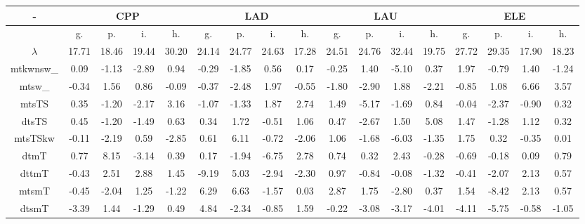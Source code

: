 \documentclass[%
 aip,
 jmp,%
 amsmath,amssymb,
 reprint,%
 floatfix,
]{revtex4-1}
\begin{document}
\begin{table}
  \centering
    \footnotesize
\setlength{\tabcolsep}{.26667em}
\begin{tabular}{|c|| c|c|c|c|| c|c|c|c|| c|c|c|c|| c|c|c|c|}\hline
-\-  & \multicolumn{4}{c|}{CPP} & \multicolumn{4}{c|}{LAD} & \multicolumn{4}{c|}{LAU} & \multicolumn{4}{c|}{ELE} \\ \hline\hline
 & g. & p. & i. & h. &     g. & p. & i. & h. &    g. & p. & i. & h. &    g. & p. & i. & h. \\\hline
$\lambda$ & 17.71 & 18.46 & 19.44 & 30.20 & 24.14 & 24.77 & 24.63 & 17.28 & 24.51 & 24.76 & 32.44 & 19.75 & 27.72 & 29.35 & 17.90 & 18.23 \\\hline
mtkwnsw\_ & 0.09 & -1.13 & -2.89 & 0.94 & -0.29 & -1.85 & 0.56 & 0.17 & -0.25 & 1.40 & -5.10 & 0.37 & 1.97 & -0.79 & 1.40 & -1.24 \\\hline
mtsw\_ & -0.34 & 1.56 & 0.86 & -0.09 & -0.37 & -2.48 & 1.97 & -0.55 & -1.80 & -2.90 & 1.88 & -2.21 & -0.85 & 1.08 & 6.66 & 3.57 \\\hline
mtsTS & 0.35 & -1.20 & -2.17 & 3.16 & -1.07 & -1.33 & 1.87 & 2.74 & 1.49 & -5.17 & -1.69 & 0.84 & -0.04 & -2.37 & -0.90 & 0.32 \\\hline
dtsTS & 0.45 & -1.20 & -1.49 & 0.63 & 0.34 & 1.72 & -0.51 & 1.06 & 0.47 & -2.67 & 1.50 & 5.08 & 1.47 & -1.28 & 1.12 & 0.32 \\\hline
mtsTSkw & -0.11 & -2.19 & 0.59 & -2.85 & 0.61 & 6.11 & -0.72 & -2.06 & 1.06 & -1.68 & -6.03 & -1.35 & 1.75 & 0.32 & -0.35 & 0.01 \\\hline
dtmT & 0.77 & 8.15 & -3.14 & 0.39 & 0.17 & -1.94 & -6.75 & 2.78 & 0.74 & 0.32 & 2.43 & -0.28 & -0.69 & -0.18 & 0.09 & 0.79 \\\hline
dttmT & -0.43 & 2.51 & 2.88 & 1.45 & -9.19 & 5.03 & -2.94 & -2.30 & 0.97 & -0.84 & -0.08 & -1.32 & -0.41 & -2.07 & 2.13 & 0.57 \\\hline
mtsmT & -0.45 & -2.04 & 1.25 & -1.22 & 6.29 & 6.63 & -1.57 & 0.03 & 2.87 & 1.75 & -2.80 & 0.37 & 1.54 & -8.42 & 2.13 & 0.57 \\\hline
dtsmT & -3.39 & 1.44 & -1.29 & 0.49 & 4.84 & -2.34 & -0.85 & 1.59 & -0.22 & -3.08 & -3.17 & -4.01 & -4.11 & -5.75 & -0.58 & -1.05 \\\hline

\end{tabular}
\end{table}
\end{document}

